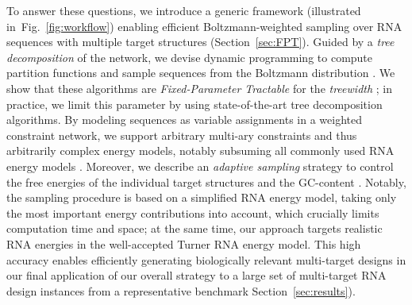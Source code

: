 \documentclass{bioinfo}
\newcommand{\Def}[1]{{\it #1}}
\newcommand{\Nuc}[1]{{\sf #1}}
\newcommand{\Cb}{\Nuc{C}}
\newcommand{\Gb}{\Nuc{G}}
\newcommand{\GCb}{\Gb\Cb}
\begin{document}
To answer these questions, we introduce a generic framework (illustrated in~Fig.~\ref{fig:workflow}) enabling efficient Boltzmann-weighted sampling over RNA sequences with multiple target structures (Section~\ref{sec:FPT}). Guided by a \Def{tree decomposition} of the network, we devise dynamic programming to compute partition functions and sample sequences from the Boltzmann distribution%
. We show that these algorithms are \Def{Fixed-Parameter Tractable} for the \Def{treewidth}%
%
; in practice, we limit this parameter by using state-of-the-art tree decomposition algorithms. 
By modeling sequences as variable assignments in a weighted constraint
network, we support arbitrary multi-ary constraints and thus
arbitrarily complex energy models,
notably subsuming all commonly
used RNA energy models%
.  Moreover, we describe an \Def{adaptive
  sampling} strategy to control the free energies of the individual
target structures and the \GCb-content%
. Notably, the sampling procedure is based on a simplified RNA energy model, taking only the most important energy contributions into account, which crucially limits computation time and space; at the same time, our approach targets realistic RNA energies in the well-accepted Turner RNA energy model. This high accuracy enables efficiently generating biologically relevant multi-target designs in our final application of our overall strategy to a large set of multi-target RNA design instances from a representative benchmark Section~\ref{sec:results}).

\end{document}
